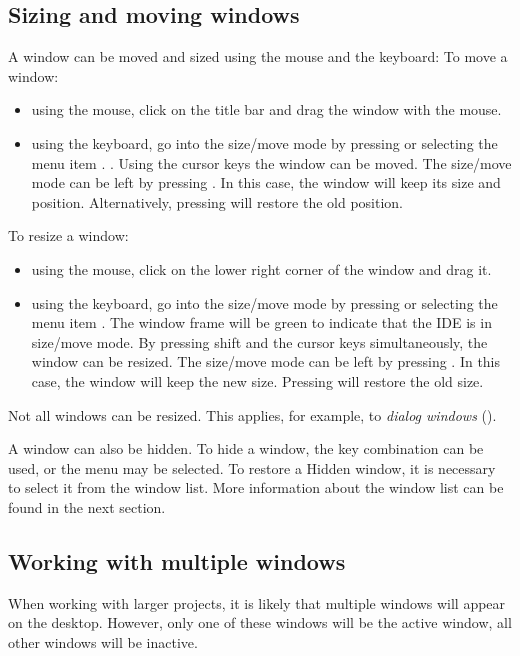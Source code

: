 %
%
\subsection{Sizing and moving windows}
\label{se:windowsizingmoving}
A window can be moved and sized using the mouse and the keyboard:
To move a window:
\begin{itemize}
\item using the mouse, click on the title bar and drag the window 
with the mouse.
\item using the keyboard, go into the size/move mode
by pressing  or selecting the menu item
. . Using the cursor keys the window can be moved. 
The size/move mode can be left by pressing . 
In this case, the window will keep its size and position. 
Alternatively, pressing  will restore the old position.
\end{itemize} 
To resize a window:
\begin{itemize}
\item using the mouse, click on the lower right corner of the window
and drag it.
\item using the keyboard, go into the size/move mode
by pressing  or selecting the menu item
. The window frame will be green to indicate that
the IDE is in size/move mode. 
By pressing shift and the cursor keys simultaneously, the window can 
be resized.  The size/move mode can be left by pressing
. In this case, the window will keep the new size.
Pressing  will restore the old size.
\end{itemize}
Not all windows can be resized. This applies, for example, to
\emph{dialog windows} ().

A window can also be hidden. To hide a window, the  key
combination can be used, or the  menu may be selected.
To restore a Hidden window, it is necessary to select it from the window
list. More information about the window list can be found in the next
section.   
%
%
\subsection{Working with multiple windows}
\label{se:multiplewindows}
When working with larger projects, it is likely that multiple windows 
will appear on the desktop. However, only one of these windows will be 
the active window, all other windows will be inactive.

